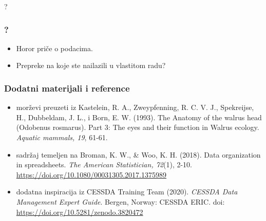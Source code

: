 \documentclass[handout,aspectratio=169]{beamer}
\newenvironment{noheadline}{
    \setbeamertemplate{headline}{}
}{}
\begin{document}
\begin{noheadline}
    \begin{frame}

    \fontsize{50}{52}\selectfont
    \centering
    ?
    \end{frame}
\end{noheadline}

\begin{frame}
    \frametitle{?}

    \begin{itemize}
        \setlength{\itemsep}{2em}

        \item Horor priče o podacima.

        \item Prepreke na koje ste nailazili u vlastitom radu?

    \end{itemize}

\end{frame}

\begin{noheadline}
    \begin{frame}
        \frametitle{Dodatni materijali i reference}

        \fontsize{10}{12}\selectfont

        \begin{itemize}
            \setlength{\itemsep}{1em}
            
            \item morževi preuzeti iz Kastelein, R. A., Zweypfenning, R. C. V.
                J., Spekreijse, H., Dubbeldam, J. L., i Born, E. W. (1993). The
                Anatomy of the walrus head (Odobenus rosmarus). Part 3: The eyes
                and their function in Walrus ecology. \textit{Aquatic mammals, 19},
                61-61.

            \item sadržaj temeljen na Broman, K. W., \& Woo, K. H. (2018). Data
                organization in spreadsheets. \textit{The American Statistician,
                72}(1), 2-10.
                \url{https://doi.org/10.1080/00031305.2017.1375989}

            \item dodatna inspiracija iz CESSDA Training Team (2020). \textit{CESSDA
                Data Management Expert Guide}. Bergen, Norway: CESSDA ERIC. doi:
                \url{https://doi.org/10.5281/zenodo.3820472}
            
        \end{itemize}
    \end{frame}
\end{noheadline}
\end{document}
